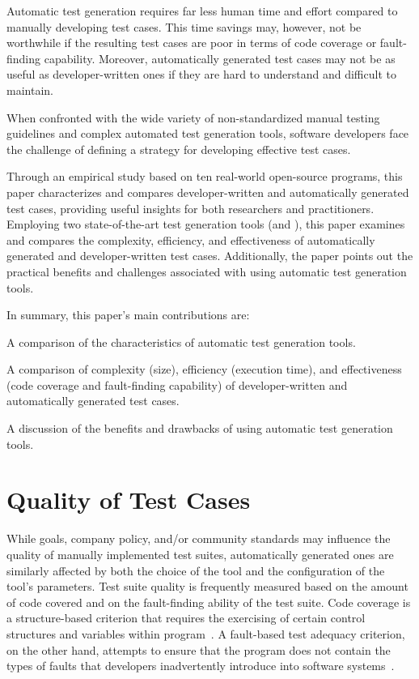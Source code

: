 Automatic test generation requires far less human time and effort compared to
manually developing test cases. This time savings may, however, not be
worthwhile if the resulting test cases are poor in terms of code coverage or
fault-finding capability.  Moreover, automatically generated test cases may not
be as useful as developer-written ones if they are hard to understand and 
difficult to maintain.

When confronted with the wide variety of non-standardized manual testing
guidelines and complex automated test generation tools, software developers face
the challenge of defining a strategy for developing effective test cases.

Through an empirical study based on ten real-world open-source programs, this
paper characterizes and compares developer-written and automatically generated
test cases, providing useful insights for both researchers and practitioners.
%
%
Employing two state-of-the-art test generation tools (\evo and \codepro), this
paper examines and compares the complexity, efficiency, and effectiveness of
automatically generated and developer-written test cases. Additionally, the
paper points out the practical benefits and challenges associated with using
automatic test generation tools.

In summary, this paper's main contributions are:
\squishlist
\item A comparison of the characteristics of automatic test generation tools.

\item A comparison of complexity (size), 
      efficiency (execution time), and 
      effectiveness (code coverage and fault-finding capability) 
      of developer-written and automatically generated test cases.

\item A discussion of the benefits and drawbacks of using automatic test 
      generation tools.
\squishend


\section{Quality of Test Cases}

While goals, company policy, and/or community standards may influence the
quality of manually implemented test suites, automatically generated ones are
similarly affected by both the choice of the tool and the configuration of the
tool's parameters.  Test suite quality is frequently measured based on the
amount of code covered and on the fault-finding ability of the test suite.  Code
coverage is a structure-based criterion that requires the exercising of certain
control structures and variables within
program~\cite{kapfhammer-testing-handbook}. A fault-based test adequacy
criterion, on the other hand, attempts to ensure that the program does not
contain the types of faults that developers inadvertently introduce into
software systems~\cite{demillo1978hints}.  

